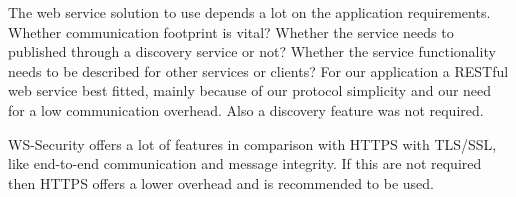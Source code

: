 The web service solution to use depends a lot on the application requirements. Whether communication footprint is vital? Whether the service needs to published through a discovery service or not? Whether the service functionality needs to be described for other services or clients? For our application a RESTful web service best fitted, mainly because of our protocol simplicity and our need for a low communication overhead. Also a discovery feature was not required.

WS-Security offers a lot of features in comparison with HTTPS with TLS/SSL, like end-to-end communication and message integrity. If this are not required then HTTPS offers a lower overhead and is recommended to be used.